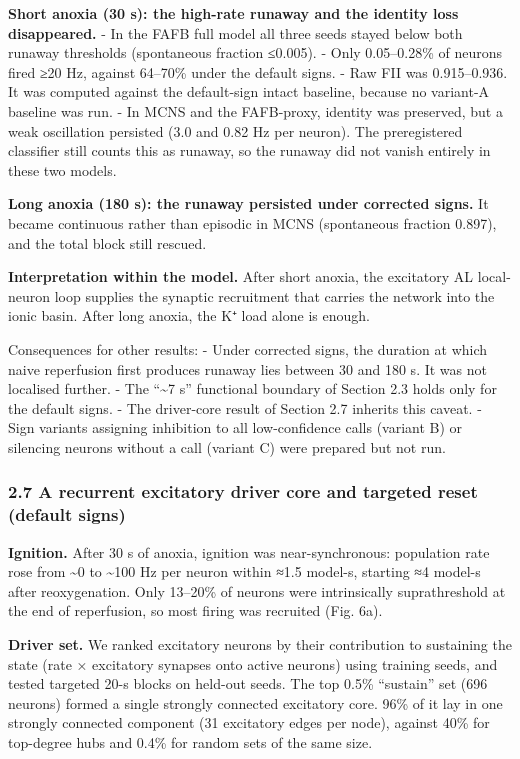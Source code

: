 \documentclass[11pt]{article}
\begin{document}
\textbf{Short anoxia (30 s): the high-rate runaway and the identity loss disappeared.}
- In the FAFB full model all three seeds stayed below both runaway thresholds (spontaneous fraction ≤0.005).
- Only 0.05--0.28\% of neurons fired ≥20 Hz, against 64--70\% under the default signs.
- Raw FII was 0.915--0.936. It was computed against the default-sign intact baseline, because no variant-A baseline was run.
- In MCNS and the FAFB-proxy, identity was preserved, but a weak oscillation persisted (3.0 and 0.82 Hz per neuron). The preregistered classifier still counts this as runaway, so the runaway did not vanish entirely in these two models.

\textbf{Long anoxia (180 s): the runaway persisted under corrected signs.} It became continuous rather than episodic in MCNS (spontaneous fraction 0.897), and the total block still rescued.

\textbf{Interpretation within the model.} After short anoxia, the excitatory AL local-neuron loop supplies the synaptic recruitment that carries the network into the ionic basin. After long anoxia, the K⁺ load alone is enough.

Consequences for other results:
- Under corrected signs, the duration at which naive reperfusion first produces runaway lies between 30 and 180 s. It was not localised further.
- The ``\textasciitilde7 s'' functional boundary of Section 2.3 holds only for the default signs.
- The driver-core result of Section 2.7 inherits this caveat.
- Sign variants assigning inhibition to all low-confidence calls (variant B) or silencing neurons without a call (variant C) were prepared but not run.

\subsubsection{2.7 A recurrent excitatory driver core and targeted reset (default signs)}\label{a-recurrent-excitatory-driver-core-and-targeted-reset-default-signs}

\textbf{Ignition.} After 30 s of anoxia, ignition was near-synchronous: population rate rose from \textasciitilde0 to \textasciitilde100 Hz per neuron within ≈1.5 model-s, starting ≈4 model-s after reoxygenation. Only 13--20\% of neurons were intrinsically suprathreshold at the end of reperfusion, so most firing was recruited (Fig. 6a).

\textbf{Driver set.} We ranked excitatory neurons by their contribution to sustaining the state (rate × excitatory synapses onto active neurons) using training seeds, and tested targeted 20-s blocks on held-out seeds. The top 0.5\% ``sustain'' set (696 neurons) formed a single strongly connected excitatory core. 96\% of it lay in one strongly connected component (31 excitatory edges per node), against 40\% for top-degree hubs and 0.4\% for random sets of the same size.
\end{document}
